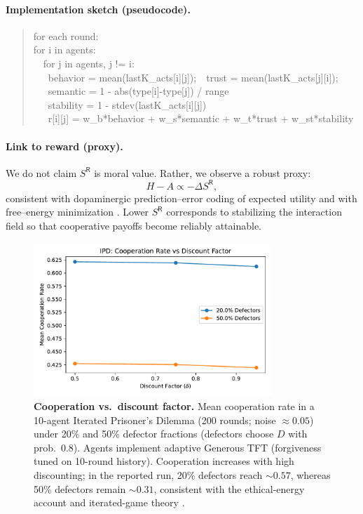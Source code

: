 \documentclass[11pt,a4paper]{article}
\begin{document}
\paragraph{Implementation sketch (pseudocode).}
\begin{quote}\small\ttfamily
for each round:\\
\quad for i in agents:\\
\quad\ \ for j in agents, j != i:\\
\quad\ \ \ behavior = mean(lastK\_acts[i][j]);\ \ trust = mean(lastK\_acts[j][i]);\\
\quad\ \ \ semantic = 1 - abs(type[i]-type[j]) / range\\
\quad\ \ \ stability = 1 - stdev(lastK\_acts[i][j])\\
\quad\ \ \ r[i][j] = w\_b*behavior + w\_s*semantic + w\_t*trust + w\_st*stability
\end{quote}

\paragraph{Link to reward (proxy).}
We do not claim $S^{\mathsf{R}}$ is moral value. Rather, we observe a robust proxy:
\[
H-A \propto -\Delta S^{\mathsf{R}},
\]
consistent with dopaminergic prediction–error coding of expected utility \cite{Schultz1998} and with free–energy minimization \cite{Friston2010}. Lower $S^{\mathsf{R}}$ corresponds to stabilizing the interaction field so that cooperative payoffs become reliably attainable.

\begin{figure}[t]
  \centering
  \includegraphics[width=0.80\textwidth]{ipd_chart.pdf}
  \caption{\textbf{Cooperation vs.\ discount factor.}
  Mean cooperation rate in a 10-agent Iterated Prisoner's Dilemma (200 rounds; noise $\approx 0.05$) under 20\% and 50\% defector fractions (defectors choose $D$ with prob.\ 0.8). Agents implement adaptive Generous TFT (forgiveness tuned on 10-round history). Cooperation increases with high discounting; in the reported run, 20\% defectors reach $\sim 0.57$, whereas 50\% defectors remain $\sim 0.31$, consistent with the ethical-energy account and iterated-game theory \cite{Axelrod1984,Nowak2006}.}
  \label{fig:ipd}
\end{figure}
\end{document}
